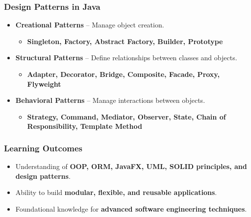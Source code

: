 \documentclass[aspectratio=169, table]{beamer}
\begin{document}
\begin{frame}[fragile]
	\frametitle{Design Patterns in Java}
	
	\begin{itemize}
		\item \textbf{Creational Patterns} – Manage object creation.
		\begin{itemize}
			\item \textbf{Singleton, Factory, Abstract Factory, Builder, Prototype}
		\end{itemize}
		\item \textbf{Structural Patterns} – Define relationships between classes and objects.
		\begin{itemize}
			\item \textbf{Adapter, Decorator, Bridge, Composite, Facade, Proxy, Flyweight}
		\end{itemize}
		\item \textbf{Behavioral Patterns} – Manage interactions between objects.
		\begin{itemize}
			\item \textbf{Strategy, Command, Mediator, Observer, State, Chain of Responsibility, Template Method}
		\end{itemize}
	\end{itemize}
\end{frame}

\begin{frame}
	\frametitle{Learning Outcomes}
	
	\begin{itemize}
		\item Understanding of \textbf{OOP, ORM, JavaFX, UML, SOLID principles, and design patterns}.
		\item Ability to build \textbf{modular, flexible, and reusable applications}.
		\item Foundational knowledge for \textbf{advanced software engineering techniques}.
	\end{itemize}
\end{frame}
\end{document}
